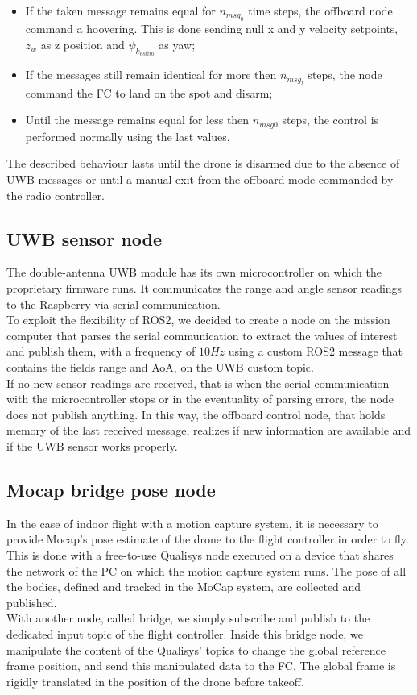 \begin{itemize}
    \begin{itemize}
        \item If the taken message remains equal for $n_{msg_{0}}$ time steps, the offboard node command a hoovering. This is done sending null x and y velocity setpoints, $z_{w}$ as z position and $\psi_{k_{estim}}$ as yaw;
        \item If the messages still remain identical for more then $n_{msg_{l}}$ steps, the node command the FC to land on the spot and disarm;
        \item Until the message remains equal for less then $n_{msg{0}}$ steps, the control is performed normally using the last values.
    \end{itemize}
    The described behaviour lasts until the drone is disarmed due to the absence of UWB messages or until a manual exit from the offboard mode commanded by the radio controller.
\end{itemize}

\subsection{UWB sensor node}
The double-antenna UWB module has its own microcontroller on which the proprietary firmware runs. It communicates the range and angle sensor readings to the Raspberry via serial communication.\\
To exploit the flexibility of ROS2, we decided to create a node on the mission computer that parses the serial communication to extract the values of interest and publish them, with a frequency of $10 Hz$ using a custom ROS2 message that contains the fields range and AoA, on the UWB custom topic.\\
If no new sensor readings are received, that is when the serial communication with the microcontroller stops or in the eventuality of parsing errors, the node does not publish anything. In this way, the offboard control node, that holds memory of the last received message, realizes if new information are available and if the UWB sensor works properly.  

\subsection{Mocap bridge pose node} \label{Mocap details}
In the case of indoor flight with a motion capture system, it is necessary to provide Mocap's pose estimate of the drone to the flight controller in order to fly. This is done with a free-to-use Qualisys node \cite{qualisysros} executed on a device that shares the network of the PC on which the motion capture system runs. The pose of all the bodies, defined and tracked in the MoCap system, are collected and published.\\
With another node, called bridge, we simply subscribe and publish to the dedicated input topic of the flight controller. Inside this bridge node, we manipulate the content of the Qualisys' topics to change the global reference frame position, and send this manipulated data to the FC. The global frame is rigidly translated in the position of the drone before takeoff.